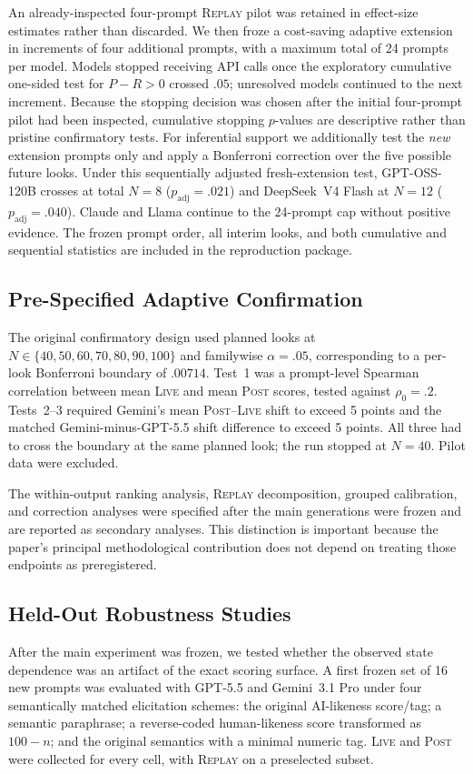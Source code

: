 \documentclass[10pt]{article}
\newcommand{\live}{\textsc{Live}}
\newcommand{\replay}{\textsc{Replay}}
\newcommand{\post}{\textsc{Post}}
\newcommand{\papersubsection}[1]{\Needspace{3.8\baselineskip}\subsection{#1}}
\begin{document}
An already-inspected four-prompt \replay{} pilot was retained in effect-size estimates rather than discarded. We then froze a cost-saving adaptive extension in increments of four additional prompts, with a maximum total of 24 prompts per model. Models stopped receiving API calls once the exploratory cumulative one-sided test for $P-R>0$ crossed $.05$; unresolved models continued to the next increment. Because the stopping decision was chosen after the initial four-prompt pilot had been inspected, cumulative stopping $p$-values are descriptive rather than pristine confirmatory tests. For inferential support we additionally test the \emph{new} extension prompts only and apply a Bonferroni correction over the five possible future looks. Under this sequentially adjusted fresh-extension test, GPT-OSS-120B crosses at total $N=8$ ($p_{\mathrm{adj}}=.021$) and DeepSeek~V4 Flash at $N=12$ ($p_{\mathrm{adj}}=.040$). Claude and Llama continue to the 24-prompt cap without positive evidence. The frozen prompt order, all interim looks, and both cumulative and sequential statistics are included in the reproduction package.

\papersubsection{Pre-Specified Adaptive Confirmation}
The original confirmatory design used planned looks at $N\in\{40,50,60,70,80,90,100\}$ and familywise $\alpha=.05$, corresponding to a per-look Bonferroni boundary of $.00714$. Test~1 was a prompt-level Spearman correlation between mean \live{} and mean \post{} scores, tested against $\rho_0=.2$. Tests~2--3 required Gemini's mean \post{}--\live{} shift to exceed 5 points and the matched Gemini-minus-GPT-5.5 shift difference to exceed 5 points. All three had to cross the boundary at the same planned look; the run stopped at $N=40$. Pilot data were excluded.

The within-output ranking analysis, \replay{} decomposition, grouped calibration, and correction analyses were specified after the main generations were frozen and are reported as secondary analyses. This distinction is important because the paper's principal methodological contribution does not depend on treating those endpoints as preregistered.

\papersubsection{Held-Out Robustness Studies}
After the main experiment was frozen, we tested whether the observed state dependence was an artifact of the exact scoring surface. A first frozen set of 16 new prompts was evaluated with GPT-5.5 and Gemini~3.1 Pro under four semantically matched elicitation schemes: the original AI-likeness score/tag; a semantic paraphrase; a reverse-coded human-likeness score transformed as $100-n$; and the original semantics with a minimal numeric tag. \live{} and \post{} were collected for every cell, with \replay{} on a preselected subset.
\end{document}
